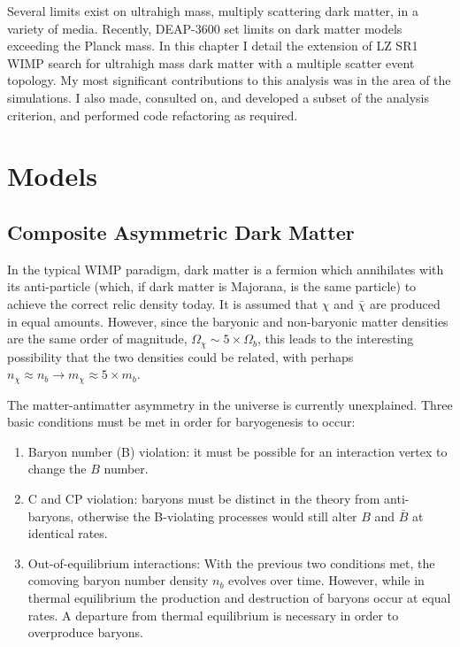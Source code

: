 Several limits exist on ultrahigh mass, multiply scattering dark matter, in a variety of media. 
Recently, DEAP-3600 set limits on dark matter models exceeding the Planck mass\cite{lai_planck_2021}.
In this chapter I detail the extension of LZ SR1 WIMP search for ultrahigh mass dark matter with a multiple scatter event topology.
My most significant contributions to this analysis was in the area of the simulations.
I also made, consulted on, and developed a subset of the analysis criterion, and performed code refactoring as required.


\section{Models}
\subsection{Composite Asymmetric Dark Matter}
In the typical WIMP paradigm, dark matter is  a fermion which annihilates with its anti-particle (which, if dark matter is Majorana, is the same particle) to achieve the correct relic density today.
It is assumed that  $\chi$ and $\bar{\chi}$ are produced in equal amounts. 
However, since the baryonic and non-baryonic matter densities are the same order of magnitude, $\Omega_{\chi} \sim 5 \times \Omega_b$\cite{planck_collaboration_planck_2020}, this leads to the interesting possibility that the two densities could be related, with perhaps $n_\chi \approx n_b \rightarrow m_\chi \approx 5 \times m_b$.

The matter-antimatter asymmetry in the universe is currently unexplained.
Three basic conditions must be met in order for baryogenesis to occur:
\begin{enumerate}
    \item Baryon number (B) violation: it must be possible for an interaction vertex to change the $B$ number.
    \item C and CP violation: baryons must be distinct in the theory from anti-baryons, otherwise the B-violating processes would still alter $B$ and $\bar{B}$ at identical rates.
    \item Out-of-equilibrium interactions: With the previous two conditions met, the comoving baryon number density $n_b$ evolves over time.
    However, while in thermal equilibrium the production and destruction of baryons occur at equal rates.
    A departure from thermal equilibrium is necessary in order to overproduce baryons. 
\end{enumerate}

